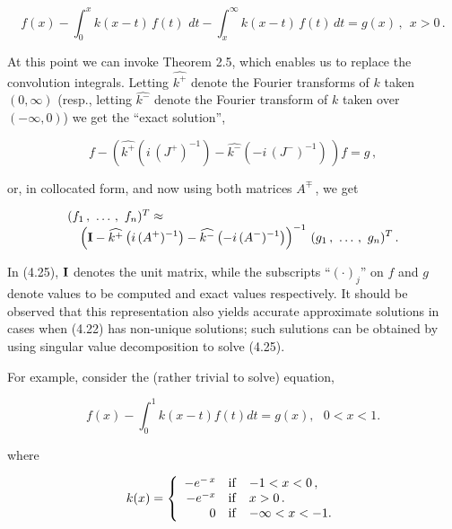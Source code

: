 \documentclass[11pt]{article}
\begin{document}
\begin{description}
\begin{equation}%
  f(x) - \displaystyle \int_0^x k(x-t)\,f(t)\,\,dt - \int_x^\infty
  k(x-t)\,f(t)\,dt = g(x)\,, \ \  x > 0\,.
  \label{equation:4.23}
\end{equation}

\noindent At this point we can invoke Theorem 2.5, which enables us to
replace the convolution integrals.  Letting $\widehat{k^+}$ denote the
Fourier transforms of $k$ taken $(0,\infty)$ (resp., letting
$\widehat{k^-}$ denote the Fourier transform of $k$ taken over
$(-\infty,0)$) we get the ``exact solution'',  

\begin{equation}%
  f - \left(\widehat{k^+}\left(i \, (J^+)^{-1}\right)  - 
  \widehat{k^-}\left(-i \, (J^-)^{-1}\right) \, \right) f  = g\,,
   \label{equation:4.24}
 \end{equation}

 \noindent or, in collocated form, and now using both matrices
 $A^\mp$\,, we get 

 \begin{equation}%
   \begin{array}{l}
     (f_1\,,\ \ldots\,,\ f_n)^T \approx \\
 \ \ \     \displaystyle \left({\bf I} - 
   \widehat{k^+}\left(i\,(A^+)^{-1}\right) - 
   \widehat{k^-}\left(-i\,(A^-)^{-1}\right)\right)^{-1} \,
   (g_1\,,\ \ldots\,,\ g_n)^T\,.
   \end{array}
 \label{equation:4.25}
 \end{equation}

\noindent In (4.25), ${\bf I}$ denotes the unit matrix, while the subscripts
``${(\cdot)_j}$'' on $f$ and $g$ denote values to be computed and exact
values respectively.   It should be observed that this representation
also yields accurate approximate solutions in cases when (4.22) has
non-unique solutions; such sulutions can be obtained by using singular
value decomposition to solve (4.25). 

\vspace{.2in} \noindent For example, consider the (rather trivial to
solve) equation,

 \begin{equation}%
       f(x) - \displaystyle \int_0^1 k(x - t) f(t) dt = g(x) , \ \ \ 0
       < x < 1 .
  \label{equation:4.26}      
\end{equation}

\noindent where

  \begin{equation}%
 \begin{array}{rcl}
 k(x) = \left\{ \begin{array}{rcl}
 - e^{-\,x} & {\rm if} & -1 < x < 0\,, \\
 - e^{-x} & {\rm if} & x > 0\,. \\
 0 & {\rm if} & -\infty < x < -1.
 \end{array}
 \right.
 \end{array}
  \label{equation:4.27}
  \end{equation}


\end{description}
\end{document}
